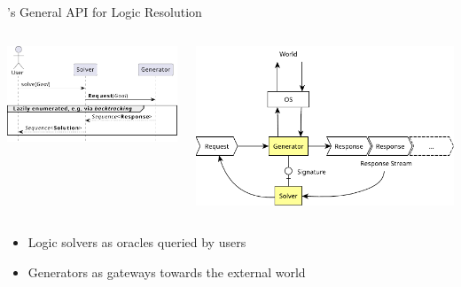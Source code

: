 \documentclass[presentation]{beamer}\mode<presentation>{\usetheme{AMSBolognaFC}}
\begin{document}
\begin{frame}{\twopkt{}'s General API for Logic Resolution}

    \begin{columns}
        \begin{column}{.49\linewidth}
            \includegraphics[width=\linewidth]{figures/primitive-usage.pdf}
        \end{column}
        \begin{column}{.49\linewidth}
            \includegraphics[width=\linewidth]{figures/generator.pdf}
        \end{column}
    \end{columns}

    \vfill

    \begin{itemize}
        \item Logic solvers as \alert{oracles} queried by users

        \vfill

        \item Generators as \alert{gateways} towards the external world
    \end{itemize}
\end{frame}
\end{document}
